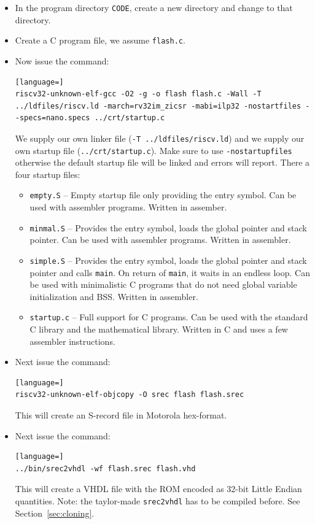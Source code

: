 \documentclass[12pt]{article}
\begin{document}
\begin{itemize}
\item In the program directory \lstinline|CODE|, create a new directory and change to that directory.
\item Create a C program file, we assume \lstinline|flash.c|.
\item Now issue the command:
\begin{lstlisting}[language=]
riscv32-unknown-elf-gcc -O2 -g -o flash flash.c -Wall -T ../ldfiles/riscv.ld -march=rv32im_zicsr -mabi=ilp32 -nostartfiles --specs=nano.specs ../crt/startup.c
\end{lstlisting}
We supply our own linker file (\lstinline|-T ../ldfiles/riscv.ld|) and we supply our own startup file (\lstinline|../crt/startup.c|). Make sure to use \lstinline|-nostartupfiles| otherwise the default startup file will be linked and errors will report. There a four startup files:
\begin{itemize}
\item \lstinline|empty.S| -- Empty startup file only providing the entry symbol. Can be used with assembler programs. Written in assember.
\item \lstinline|minmal.S| -- Provides the entry symbol, loads the global pointer and stack pointer. Can be used with assembler programs. Written in assembler.
\item \lstinline|simple.S| -- Provides the entry symbol, loads the global pointer and stack pointer and calls \lstinline|main|. On return of \lstinline|main|, it waits in an endless loop. Can be used with minimalistic C programs that do not need global variable initialization and BSS. Written in assembler.
\item \lstinline|startup.c| -- Full support for C programs. Can be used with the standard C library and the mathematical library. Written in C and uses a few assembler instructions.
\end{itemize}
\item Next issue the command:
\begin{lstlisting}[language=]
riscv32-unknown-elf-objcopy -O srec flash flash.srec
\end{lstlisting}
This will create an S-record file in Motorola hex-format.
\item Next issue the command:
\begin{lstlisting}[language=]
../bin/srec2vhdl -wf flash.srec flash.vhd
\end{lstlisting}
This will create a VHDL file with the ROM encoded as 32-bit Little Endian quantities. Note: the taylor-made \lstinline|srec2vhdl| has to be compiled before. See Section~\ref{sec:cloning}.

\end{itemize}
\end{document}
